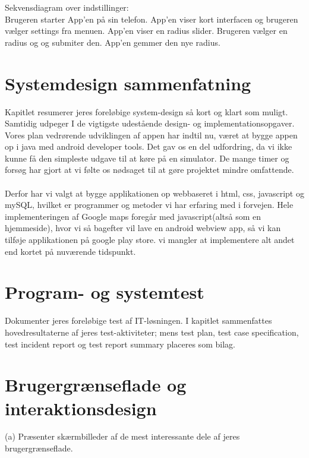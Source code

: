 \documentclass[12pt]{article}
\begin{document}
Sekvensdiagram over indstillinger:\\
Brugeren starter App'en på sin telefon. App'en viser kort interfacen og brugeren vælger settings fra menuen.
App'en viser en radius slider. Brugeren vælger en radius og og submiter den. App'en gemmer den nye radius.


\pagebreak

\section{Systemdesign sammenfatning}
Kapitlet resumerer jeres foreløbige system-design så kort og klart som muligt. Samtidig
udpeger I de vigtigste udestående design- og implementationsopgaver.\\

Vores plan vedrørende udviklingen af appen har indtil nu, været at bygge appen op i java med android developer tools. Det gav os en del udfordring, da vi ikke kunne få den simpleste udgave til at køre på en simulator. De mange timer og forsøg har gjort at vi følte os nødsaget til at gøre projektet mindre omfattende. 
\\\\
Derfor har vi valgt at bygge applikationen op webbaseret i html, css, javascript og mySQL, hvilket er programmer og metoder vi har erfaring med i forvejen. 
Hele implementeringen af Google maps foregår med javascript(altså som en hjemmeside), hvor vi så bagefter vil lave en android webview app, så vi kan tilføje applikationen på google play store. vi mangler at implementere alt andet end kortet på nuværende tidspunkt.

\section{Program- og systemtest}
Dokumenter jeres foreløbige test af IT-løsningen. I kapitlet sammenfattes hovedresultaterne af
jeres test-aktiviteter; mens test plan, test case specification, test incident report og test report
summary placeres som bilag.

\pagebreak
\section{Brugergrænseflade og interaktionsdesign}
(a) Præsenter skærmbilleder af de mest interessante dele af jeres brugergrænseflade.
\end{document}
